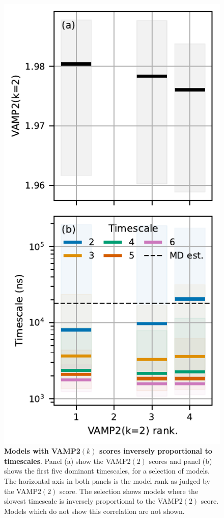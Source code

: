 \documentclass[journal=jacsat,manuscript=article]{achemso}
\begin{document}
\begin{figure}
    \centering
    \includegraphics{results2/bad_vamp_ranks.pdf}
    \caption{\textbf{Models with VAMP2$(k)$ scores inversely proportional to timescales}. Panel (a) show the VAMP2$(2)$ scores and panel (b) shows the first five dominant timescales, for a selection of models.  The horizontal axis in both panels is the model rank as judged by the VAMP2$(2)$ score. The selection shows models where the slowest timescale is inversely proportional to the VAMP2$(2)$ score. Models which do not show this correlation are not shown. }
    \label{fig:bad_vamp_scores}
\end{figure}
\end{document}

